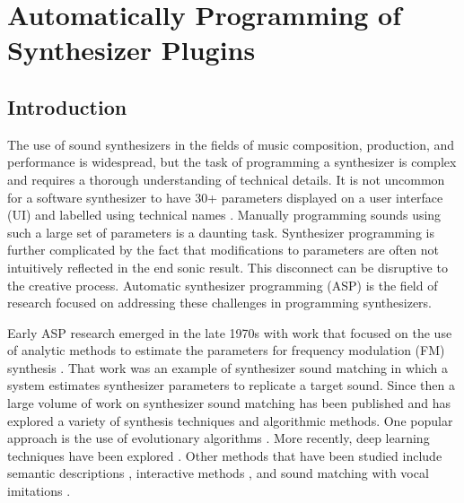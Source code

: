 \graphicspath{{./}{./figures/}{./figures/5/}}

\chapter{Automatically Programming of Synthesizer Plugins}

\section{Introduction}
The use of sound synthesizers in the fields of music composition, production, and performance is widespread, but the task of programming a synthesizer is complex and requires a thorough understanding of technical details. It is not uncommon for a software synthesizer to have 30+ parameters displayed on a user interface (UI) and labelled using technical names \cite{rasmussen2018evaluating}. Manually programming sounds using such a large set of parameters is a daunting task. Synthesizer programming is further complicated by the fact that modifications to parameters are often not intuitively reflected in the end sonic result. This disconnect can be disruptive to the creative process. Automatic synthesizer programming (ASP) is the field of research focused on addressing these challenges in programming synthesizers.

 Early ASP research emerged in the late 1970s with work that focused on the use of analytic methods to estimate the parameters for frequency modulation (FM) synthesis \cite{justice1979analytic}. That work was an example of synthesizer sound matching in which a system estimates synthesizer parameters to replicate a target sound. Since then a large volume of work on synthesizer sound matching has been published and has explored a variety of synthesis techniques and algorithmic methods. One popular approach is the use of evolutionary algorithms \cite{horner1993machine, mitchell2007evolutionary, yee2007evolving, yee2008synthbot, heise2009automatic, roth2011comparison, tatar2016automatic, smith2017play}. More recently, deep learning techniques have been explored \cite{yee2018automatic, barkan2019inversynth, esling2020flow}. Other methods that have been studied include semantic descriptions \cite{ethington1994seawave, johnson2006timbre, krekovic2016algorithm}, interactive methods \cite{johnson1999exploring, dahlstedt2001creating, yee2016use}, and sound matching with vocal imitations \cite{mcartwright2014, zhang2018visualization}.
 
